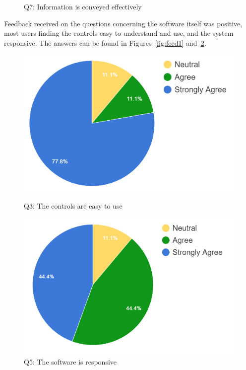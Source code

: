 \begin{figure}[h]
\begin{minipage}[b]{0.45\textwidth}
		\caption{\label{fig:simfeed3}Q7: Information is conveyed effectively}
	\end{minipage}
\end{figure}

Feedback received on the questions concerning the software itself was positive, most users finding the controls easy to understand and use, and the system responsive. The answers can be found in Figures~\ref{fig:feed1} and~\ref{fig:feed2}.

\begin{figure}[!th]
	\centering
	\begin{minipage}[b]{0.49\textwidth}
		\includegraphics[scale=0.6]{images/q6}
		\caption{\label{fig:feed1}Q3: The controls are easy to use}
	\end{minipage}
	\hfill
	\begin{minipage}[b]{0.5\textwidth}
		\includegraphics[scale=0.6]{images/q7}
		\caption{\label{fig:feed2}Q5: The software is responsive}
	\end{minipage}
\end{figure}

